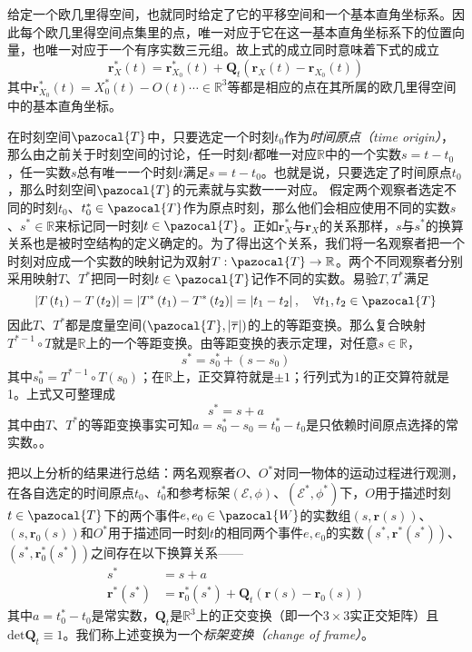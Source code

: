 \documentclass[main.tex]{subfiles}
\begin{document}
给定一个欧几里得空间，也就同时给定了它的平移空间和一个基本直角坐标系。因此每个欧几里得空间点集里的点，唯一对应于它在这一基本直角坐标系下的位置向量，也唯一对应于一个有序实数三元组。故上式的成立同时意味着下式的成立
\[\mathbf{r}_X^*\left(t\right)=\mathbf{r}_{X_0}^*\left(t\right)+\mathbf{Q}_t\left(\mathbf{r}_X\left(t\right)-\mathbf{r}_{X_0}\left(t\right)\right)\]
其中$\mathbf{r}^*_{X_0}\left(t\right)=X_0^*\left(t\right)-O\left(t\right)\cdots\in\mathbb{R}^3$等都是相应的点在其所属的欧几里得空间中的基本直角坐标。

在时刻空间$\pazocal{T}$中，只要选定一个时刻$t_0$作为\emph{时间原点（time origin）}，那么由之前关于时刻空间的讨论，任一时刻$t$都唯一对应$\mathbb{R}$中的一个实数$s=t-t_0$，任一实数$s$总有唯一一个时刻$t$满足$s=t-t_0$。也就是说，只要选定了时间原点$t_0$，那么时刻空间$\pazocal{T}$的元素就与实数一一对应。
假定两个观察者选定不同的时刻$t_0$、$t_0^*\in\pazocal{T}$作为原点时刻，那么他们会相应使用不同的实数$s$、$s^*\in\mathbb{R}$来标记同一时刻$t\in\pazocal{T}$。正如$\mathbf{r}^*_X$与$\mathbf{r}_X$的关系那样，$s$与$s^*$的换算关系也是被时空结构的定义确定的。为了得出这个关系，我们将一名观察者把一个时刻对应成一个实数的映射记为双射$T:\pazocal{T}\rightarrow\mathbb{R}$。两个不同观察者分别采用映射$T$、$T^*$把同一时刻$t\in\pazocal{T}$记作不同的实数。易验$T,T^*$满足
\[\left|T\left(t_1\right)-T\left(t_2\right)\right|=\left|T^*\left(t_1\right)-T^*\left(t_2\right)\right|=\left|t_1-t_2\right|,\quad\forall t_1,t_2\in\pazocal{T}\]
因此$T$、$T^*$都是度量空间$\left(\pazocal{T},\left|\overline{\tau}\right|\right)$的上的等距变换。那么复合映射$T^{*-1}\circ T$就是$\mathbb{R}$上的一个等距变换。由等距变换的表示定理，对任意$s\in\mathbb{R}$，
\[s^*=s_0^*+\left(s-s_0\right)\]
其中$s_0^*=T^{*-1}\circ T\left(s_0\right)$；在$\mathbb{R}$上，正交算符就是$\pm 1$；行列式为1的正交算符就是1。上式又可整理成
\[s^*=s+a\]
其中由$T$、$T^*$的等距变换事实可知$a=s_0^*-s_0=t_0^*-t_0$是只依赖时间原点选择的常实数。。

把以上分析的结果进行总结：两名观察者$O$、$O^*$对同一物体的运动过程进行观测，在各自选定的时间原点$t_0$、$t_0^*$和参考标架$\left(\mathcal{E},\phi\right)$、$\left(\mathcal{E}^*,\phi^*\right)$下，$O$用于描述时刻$t\in\pazocal{T}$下的两个事件$e,e_0\in\pazocal{W}$的实数组$\left(s,\mathbf{r}\left(s\right)\right)$、$\left(s,\mathbf{r}_0\left(s\right)\right)$和$O^*$用于描述同一时刻$t$的相同两个事件$e,e_0$的实数$\left(s^*,\mathbf{r}^*\left(s^*\right)\right)$、$\left(s^*,\mathbf{r}^*_0\left(s^*\right)\right)$之间存在以下换算关系——
\begin{align*}
    s^*                          & =s+a                                                                                                         \\
    \mathbf{r}^*\left(s^*\right) & =\mathbf{r}_0^*\left(s^*\right)+\mathbf{Q}_t\left(\mathbf{r}\left(s\right)-\mathbf{r}_0\left(s\right)\right)
\end{align*}
其中$a=t_0^*-t_0$是常实数，$\mathbf{Q}_t$是$\mathbb{R}^3$上的正交变换（即一个$3\times 3$实正交矩阵）且$\mathrm{det}\mathbf{Q}_t\equiv 1$。我们称上述变换为一个\emph{标架变换（change of frame）}。
\end{document}
